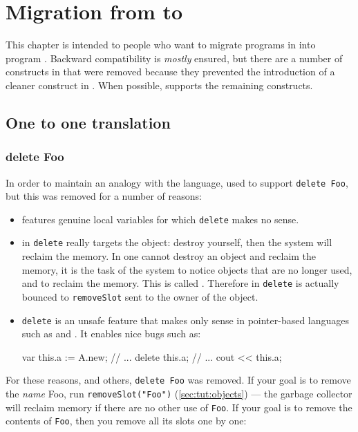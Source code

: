 \chapter{Migration from  to }

This chapter is intended to people who want to migrate programs in  into program .  Backward compatibility is \emph{mostly}
ensured, but there are a number of constructs in  that were
removed because they prevented the introduction of a cleaner construct
in .  When possible,  supports the remaining 
constructs.

\section{One to one translation}

\subsection{delete Foo}

In order to maintain an analogy with the \Cxx language, \us used to
support \lstinline{delete Foo}, but this was removed for a number of
reasons:
\begin{itemize}
\item {} features genuine local variables for which
  \lstinline{delete} makes no sense.
\item in \Cxx \lstinline{delete} really targets the object: destroy
  yourself, then the system will reclaim the memory.  In \us one
  cannot destroy an object and reclaim the memory, it is the task of
  the system to notice objects that are no longer used, and to reclaim
  the memory.  This is called .  Therefore in
  \us \lstinline{delete} is actually bounced to \lstinline{removeSlot}
  sent to the owner of the object.
\item \lstinline{delete} is an unsafe feature that makes only sense in
  pointer-based languages such as \C and \Cxx.  It enables nice bugs
  such as:
\begin{urbifixme}
var this.a := A.new;
// ...
delete this.a;
// ...
cout << this.a;
\end{urbifixme}
\end{itemize}

For these reasons, and others, \lstinline{delete Foo} was removed.  If
your goal is to remove the \emph{name} Foo, run
{\lstinline{removeSlot("Foo")}} (\autoref{sec:tut:objects}) --- the
garbage collector will reclaim memory if there are no other use of
\lstinline{Foo}.  If your goal is to remove the contents of
\lstinline{Foo}, then you remove all its slots one by one:

